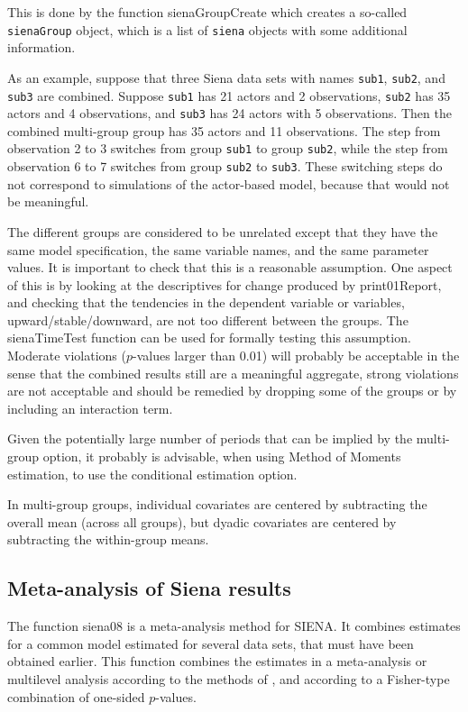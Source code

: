 \documentclass[a4paper,fleqn,11pt]{article}
\newcommand{\+}{\, + \,}
\newcommand{\si}{{\sf SIENA}}
\begin{document}
This is done by the function \textsf{sienaGroupCreate} which creates
a so-called \texttt{sienaGroup} object, which is a list of
\texttt{siena} objects with some additional information.

As an example, suppose that three Siena data sets with names {\tt sub1}, {\tt sub2},
and {\tt sub3} are combined. Suppose {\tt sub1} has 21 actors and
2 observations, {\tt sub2} has 35 actors and 4 observations,
and {\tt sub3} has 24 actors with 5 observations.
Then the combined multi-group group has 35 actors and 11 observations.
The step from observation 2 to 3 switches from group {\tt sub1}
to group {\tt sub2}, while
the step from observation 6 to 7 switches from group {\tt sub2}
to {\tt sub3}. These switching steps do not correspond to simulations
of the actor-based model, because that would not be meaningful.

The different groups are considered to be unrelated
except that they have the same model specification,
the same variable names, and the same parameter values.
It is important to check that this is a reasonable assumption.
One aspect of this is by looking at the descriptives for change
produced by \textsf{print01Report}, and checking that the
tendencies in the dependent variable or variables, upward/stable/downward,
are not too different between the groups.
The \textsf{sienaTimeTest} function can be used for
formally testing this assumption.
Moderate violations ($p$-values larger than 0.01) will probably
be acceptable in the sense that the combined results
still are a meaningful aggregate, strong violations are not acceptable
and should be remedied by dropping some of the groups or by
including an interaction term.

Given the potentially large number of periods that can be implied
by the multi-group option, it probably is advisable,
when using Method of Moments estimation, to use
the conditional estimation option.

In multi-group groups, individual covariates are centered by subtracting
the overall mean (across all groups), but dyadic covariates are centered
by subtracting the within-group means.



\subsection{Meta-analysis of Siena results}
\label{S_Siena08}

The function \textsf{siena08} is a meta-analysis method for \si.
It combines estimates for a common model
   estimated for several data sets,
   that must have been obtained earlier.
   This function combines
   the estimates in a meta-analysis or multilevel analysis
   according to the methods of \citet{SnijdersBaerveldt03},
   and according to a Fisher-type combination of one-sided $p$-values.
\end{document}
